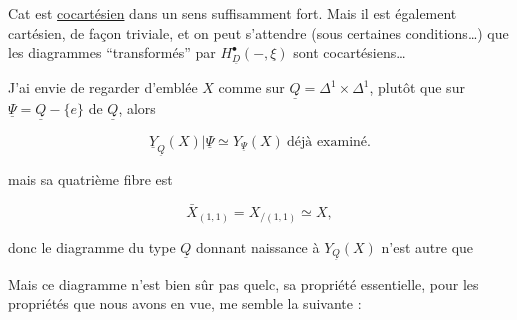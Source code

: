  Cat  est \uline{cocartésien} dans un sens suffisamment fort. Mais il est également cartésien, de façon triviale, et on peut s'attendre (sous certaines conditions\ldots) que les diagrammes ``transformés'' par $H^\bullet_{\underline D}(-,\xi)$ sont cocartésiens\ldots

J'ai envie de regarder d'emblée $X$ comme sur $\underline Q=\Delta^1\times\Delta^1$, plutôt que sur  $\underline\Psi=\underline Q-\{e\}$ de $\underline Q$, alors

\[
\underline Y_{\underline Q}(X)|\underline\Psi\simeq Y_{\underline\Psi}(X)\ \text{déjà examiné.}
\]


mais sa quatrième fibre est

\[
\bar X_{(1,1)}=X_{/(1,1)}\simeq X,
\]

donc le diagramme  du type $\underline Q$ donnant naissance à $Y_{\underline Q}(X)$ n'est autre que


Mais ce diagramme  n'est bien sûr pas quelc, sa propriété essentielle, pour les propriétés que nous avons en vue, me semble la suivante :




